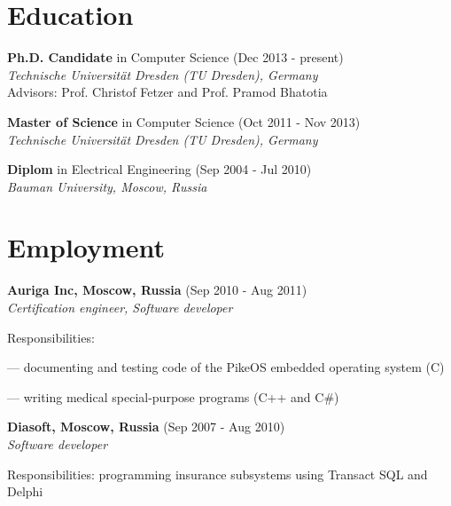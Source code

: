 \documentclass[letterpaper]{article}
\renewenvironment{itemize}{
  \begin{list}{}{
    \setlength{\leftmargin}{1.5em}
  }
}{
  \end{list}
}
\begin{document}
\section*{Education}

\begin{itemize}

 \item \textbf{Ph.D. Candidate} in Computer Science (Dec 2013 - present)\\
 {\em  Technische Universit{\"a}t Dresden (TU Dresden), Germany}\\
Advisors: Prof. Christof Fetzer and Prof. Pramod Bhatotia

 \item \textbf{Master of Science} in Computer Science (Oct 2011 - Nov 2013) \\
 {\em  Technische Universit{\"a}t Dresden (TU Dresden), Germany}


\item \textbf{Diplom} in Electrical Engineering (Sep 2004 - Jul 2010)\\
  {\em Bauman University, Moscow, Russia} 

\end{itemize}



\section*{Employment}

{\bf Auriga Inc, Moscow, Russia} (Sep 2010 - Aug 2011)\\
{\em Certification engineer, Software developer}
\begin{itemize}
	\item Responsibilities:
		\begin{itemize}
		\item --- documenting and testing code of the PikeOS embedded operating system (C)
		\item --- writing medical special-purpose programs (C++ and C\#)
		\end{itemize}
	\item 
\end{itemize}

{\bf Diasoft, Moscow, Russia} (Sep 2007 - Aug 2010)\\
{\em Software developer}
\begin{itemize}
	\item Responsibilities: programming insurance subsystems using Transact SQL and Delphi
\end{itemize}
\end{document}
